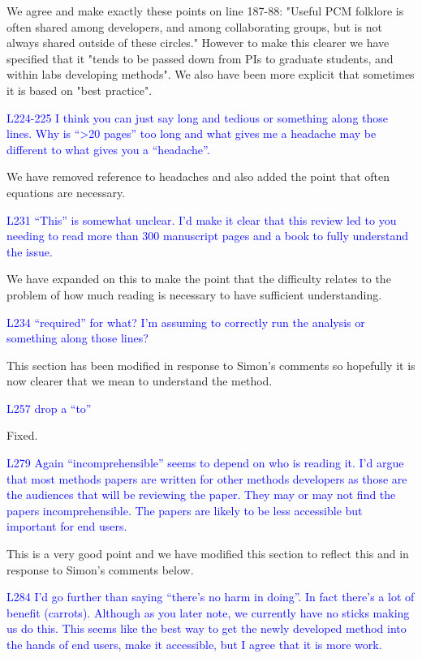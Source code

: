 \documentclass[12pt]{letter}
\begin{document}
\begin{letter}{}
We agree and make exactly these points on line 187-88: "Useful PCM folklore is often shared among developers, and among collaborating groups, but is not always shared outside of these circles." However to make this clearer we have specified that it "tends to be passed down from PIs to graduate students, and within labs developing methods". We also have been more explicit that sometimes it is based on "best practice".

\textcolor{blue}{L224-225 I think you can just say long and tedious or something along those lines. Why is “>20 pages” too long and what gives me a headache may be different to what gives you a “headache”.}

We have removed reference to headaches and also added the point that often equations are necessary.

\textcolor{blue}{L231 “This” is somewhat unclear. I'd make it clear that this review led to you needing to read more than 300 manuscript pages and a book to fully understand the issue.}

We have expanded on this to make the point that the difficulty relates to the problem of how much reading is necessary to have sufficient understanding. 

\textcolor{blue}{L234 “required” for what? I'm assuming to correctly run the analysis or something along those lines?}

This section has been modified in response to Simon's comments so hopefully it is now clearer that we mean to understand the method.

\textcolor{blue}{L257 drop a “to”}

Fixed.

\textcolor{blue}{L279 Again “incomprehensible” seems to depend on who is reading it. I'd argue that most methods papers are written for other methods developers as those are the audiences that will be reviewing the paper. They may or may not find the papers incomprehensible. The papers are likely to be less accessible but important for end users.}

This is a very good point and we have modified this section to reflect this and in response to Simon's comments below.

\textcolor{blue}{L284 I'd go further than saying “there's no harm in doing”. In fact there's a lot of benefit (carrots). Although as you later note, we currently have no sticks making us do this. This seems like the best way to get the newly developed method into the hands of end users, make it accessible, but I agree that it is more work.}


\end{letter}
\end{document}
